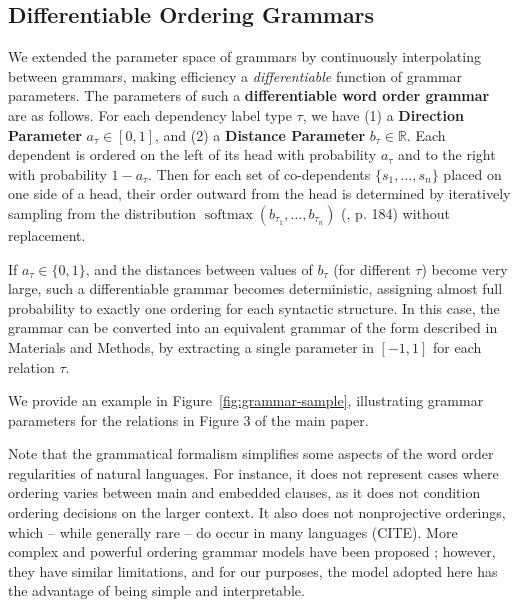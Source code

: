 \documentclass[10pt,twoside,lineno]{article}
\newcommand{\key}[1]{\textbf{#1}}
\begin{document}
\subsection{Differentiable Ordering Grammars}\label{sec:diff-gramm}

We extended the parameter space of grammars by continuously interpolating between grammars, making efficiency a \emph{differentiable} function of grammar parameters.
The parameters of such a \key{differentiable word order grammar} are as follows. 
For each dependency label type $\tau$, we have (1) a \key{Direction Parameter} $a_\tau \in [0,1]$, and (2) a \key{Distance Parameter} $b_\tau \in \mathbb{R}$. 
Each dependent is ordered on the left of its head with probability $a_\tau$ and to the right with probability $1-a_\tau$. 
Then for each set of co-dependents $\{s_1, \dots , s_n\}$ placed on one side of a head, their order outward from the head is determined by iteratively sampling from the distribution $\operatorname{softmax}(b_{\tau_1}, \dots, b_{\tau_n})$ (\cite{goodfellow2016deep}, p. 184) without replacement. 

If $a_\tau \in \{0, 1\}$, and the distances between values of $b_\tau$ (for different $\tau$) become very large, such a differentiable grammar becomes deterministic, assigning almost full probability to exactly one ordering for each syntactic structure.
In this case, the grammar can be converted into an equivalent grammar of the form described in Materials and Methods, by extracting a single parameter in $[-1, 1]$ for each relation $\tau$.

We provide an example in Figure~\ref{fig:grammar-sample}, illustrating grammar parameters for the relations in Figure 3 of the main paper.

Note that the grammatical formalism simplifies some aspects of the word order regularities of natural languages.
For instance, it does not represent cases where ordering varies between main and embedded clauses, as it does not condition ordering decisions on the larger context.
It also does not nonprojective orderings, which -- while generally rare -- do occur in many languages (CITE).
More complex and powerful ordering grammar models have been proposed \cite{futrell2015experiments, wang2016galactic}; however, they have similar limitations, and for our purposes, the model adopted here has the advantage of being simple and interpretable.
\end{document}
